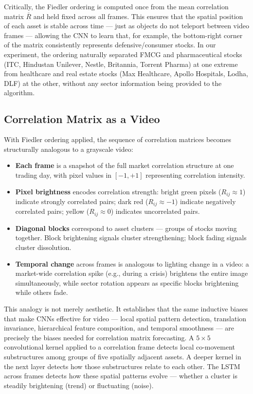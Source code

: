 \documentclass[runningheads]{llncs}
\begin{document}
Critically, the Fiedler ordering is computed once from the mean
correlation matrix $\bar{R}$ and held fixed across all frames. This
ensures that the spatial position of each asset is stable across time
--- just as objects do not teleport between video frames --- allowing
the CNN to learn that, for example, the bottom-right corner of the
matrix consistently represents defensive/consumer stocks. In our
experiment, the ordering naturally separated FMCG and pharmaceutical
stocks (ITC, Hindustan Unilever, Nestle, Britannia, Torrent Pharma)
at one extreme from healthcare and real estate stocks (Max Healthcare,
Apollo Hospitals, Lodha, DLF) at the other, without any sector
information being provided to the algorithm.

\subsection{Correlation Matrix as a Video}\label{sec:video_formulation}

With Fiedler ordering applied, the sequence of correlation matrices
becomes structurally analogous to a grayscale video:

\begin{itemize}
    \item \textbf{Each frame} is a snapshot of the full market
    correlation structure at one trading day, with pixel values
    in $[-1, +1]$ representing correlation intensity.
    \item \textbf{Pixel brightness} encodes correlation strength:
    bright green pixels ($R_{ij} \approx 1$) indicate strongly
    correlated pairs; dark red ($R_{ij} \approx -1$) indicate
    negatively correlated pairs; yellow ($R_{ij} \approx 0$)
    indicates uncorrelated pairs.
    \item \textbf{Diagonal blocks} correspond to asset clusters
    --- groups of stocks moving together. Block brightening signals
    cluster strengthening; block fading signals cluster dissolution.
    \item \textbf{Temporal change} across frames is analogous to
    lighting change in a video: a market-wide correlation spike
    (e.g., during a crisis) brightens the entire image simultaneously,
    while sector rotation appears as specific blocks brightening while
    others fade.
\end{itemize}

This analogy is not merely aesthetic. It establishes that the same
inductive biases that make CNNs effective for video --- local spatial
pattern detection, translation invariance, hierarchical feature
composition, and temporal smoothness --- are precisely the biases
needed for correlation matrix forecasting. A $5\times5$ convolutional
kernel applied to a correlation frame detects local co-movement
substructures among groups of five spatially adjacent assets. A deeper
kernel in the next layer detects how those substructures relate to
each other. The LSTM across frames detects how these spatial patterns
evolve --- whether a cluster is steadily brightening (trend) or
fluctuating (noise).
\end{document}
